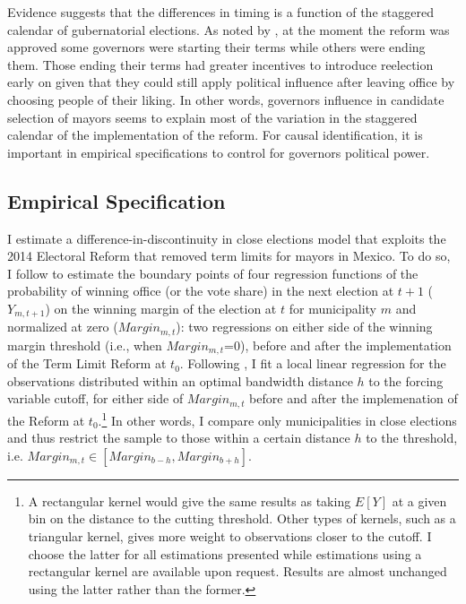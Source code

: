 Evidence suggests that the differences in timing is a function of the staggered calendar of gubernatorial elections. As noted by \citet{motolinia_2020}, at the moment the reform was approved some governors were starting their terms while others were ending them. Those ending their terms had greater incentives to introduce reelection early on given that they could still apply political influence after leaving office by choosing people of their liking. In other words, governors influence in candidate selection of mayors seems to explain most of the variation in the staggered calendar of the implementation of the reform. For causal identification, it is important in empirical specifications to control for governors political power. 

\subsection{Empirical Specification} 
  
I estimate  a difference-in-discontinuity in close elections model that exploits the 2014 Electoral Reform that removed term limits for mayors in Mexico. To do so, I follow \citet{grembi_etal_2017} to estimate the boundary points of four regression functions of the probability of winning office (or the vote share) in the next election at $t+1$ ($Y_{m,t+1}$) on the winning margin of the election at $t$ for municipality $m$ and normalized at zero ($Margin_{m,t}$): two regressions on either side of the winning margin threshold (i.e., when $Margin_{m,t}$=0), before and after the implementation of the Term Limit Reform at $t_0$. Following \citet{gelman_imbens2014}, I fit a local linear regression for the observations distributed within an  \citet{calonicoetal_2014} optimal bandwidth distance $h$ to the forcing variable cutoff, for either side of $Margin_{m,t}$ before and after the implemenation of the Reform at $t_0$.\footnote{A rectangular kernel would give the same results as taking $E[Y]$ at a given bin on the distance to the cutting threshold. Other types of kernels, such as a triangular kernel, gives more weight to observations closer to the cutoff. I choose the latter for all estimations presented while estimations using a rectangular kernel are available upon request. Results are almost unchanged using the latter rather than the former.} In other words, I compare only municipalities in close elections and thus restrict the sample to those within a certain distance $h$ to the threshold, i.e. $Margin_{m,t} \in [Margin_{b-h}, Margin_{b+h}]$.  

